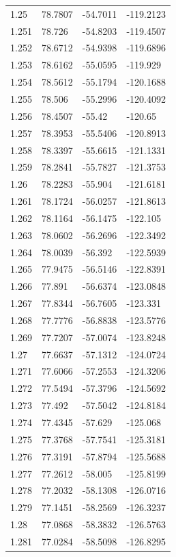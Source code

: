\begin{tabular}{llll}
1.25 & 78.7807 & -54.7011 & -119.2123 \\
1.251 & 78.726 & -54.8203 & -119.4507 \\
1.252 & 78.6712 & -54.9398 & -119.6896 \\
1.253 & 78.6162 & -55.0595 & -119.929 \\
1.254 & 78.5612 & -55.1794 & -120.1688 \\
1.255 & 78.506 & -55.2996 & -120.4092 \\
1.256 & 78.4507 & -55.42 & -120.65 \\
1.257 & 78.3953 & -55.5406 & -120.8913 \\
1.258 & 78.3397 & -55.6615 & -121.1331 \\
1.259 & 78.2841 & -55.7827 & -121.3753 \\
1.26 & 78.2283 & -55.904 & -121.6181 \\
1.261 & 78.1724 & -56.0257 & -121.8613 \\
1.262 & 78.1164 & -56.1475 & -122.105 \\
1.263 & 78.0602 & -56.2696 & -122.3492 \\
1.264 & 78.0039 & -56.392 & -122.5939 \\
1.265 & 77.9475 & -56.5146 & -122.8391 \\
1.266 & 77.891 & -56.6374 & -123.0848 \\
1.267 & 77.8344 & -56.7605 & -123.331 \\
1.268 & 77.7776 & -56.8838 & -123.5776 \\
1.269 & 77.7207 & -57.0074 & -123.8248 \\
1.27 & 77.6637 & -57.1312 & -124.0724 \\
1.271 & 77.6066 & -57.2553 & -124.3206 \\
1.272 & 77.5494 & -57.3796 & -124.5692 \\
1.273 & 77.492 & -57.5042 & -124.8184 \\
1.274 & 77.4345 & -57.629 & -125.068 \\
1.275 & 77.3768 & -57.7541 & -125.3181 \\
1.276 & 77.3191 & -57.8794 & -125.5688 \\
1.277 & 77.2612 & -58.005 & -125.8199 \\
1.278 & 77.2032 & -58.1308 & -126.0716 \\
1.279 & 77.1451 & -58.2569 & -126.3237 \\
1.28 & 77.0868 & -58.3832 & -126.5763 \\
1.281 & 77.0284 & -58.5098 & -126.8295 \\

\end{tabular}
